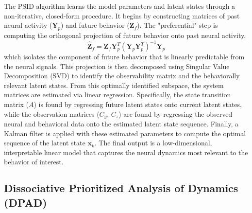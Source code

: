 \documentclass[12pt, a4paper]{article}
\begin{document}
The PSID algorithm learns the model parameters and latent states through a non-iterative, closed-form procedure. It begins by constructing matrices of past neural activity ($\mathbf{Y}_p$) and future behavior ($\mathbf{Z}_f$). The "preferential" step is computing the orthogonal projection of future behavior onto past neural activity,
\[
    \hat{\mathbf{Z}}_f = \mathbf{Z}_f \mathbf{Y}_p^T (\mathbf{Y}_p \mathbf{Y}_p^T)^{-1} \mathbf{Y}_p
\]
which isolates the component of future behavior that is linearly predictable from the neural signals. This projection is then decomposed using Singular Value Decomposition (SVD) to identify the observability matrix and the behaviorally relevant latent states. From this optimally identified subspace, the system matrices are estimated via linear regression. Specifically, the state transition matrix ($A$) is found by regressing future latent states onto current latent states, while the observation matrices ($C_y$, $C_z$) are found by regressing the observed neural and behavioral data onto the estimated latent state sequence. Finally, a Kalman filter is applied with these estimated parameters to compute the optimal sequence of the latent state $\mathbf{x}_k$. The final output is a low-dimensional, interpretable linear model that captures the neural dynamics most relevant to the behavior of interest.

\subsection{Dissociative Prioritized Analysis of Dynamics (DPAD)}
\end{document}
